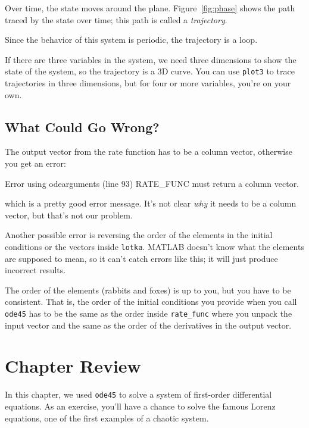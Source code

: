 
Over time, the state moves around the plane. Figure~\ref{fig:phase} shows
the path traced by the state over time; this path
is called a \emph{trajectory}.

Since the behavior of this system is periodic, the trajectory is a loop.

If there are three variables in the system, we need three dimensions to show
the state of the system, so the trajectory is a 3D curve.
You can use \lstinline{plot3} to trace trajectories in three dimensions,
but for four or more variables, you're on your own.



\subsection{What Could Go Wrong?}

The output vector from the rate function has to be a column vector, otherwise you get an error:

\begin{code}
Error using odearguments (line 93)
RATE_FUNC must return a column vector.
\end{code}
which is a pretty good error message.  It's not clear \emph{why}
it needs to be a column vector, but that's not our problem.


Another possible error is reversing the order of the elements in the
initial conditions or the vectors inside \lstinline{lotka}.  MATLAB
doesn't know what the elements are supposed to mean, so it can't catch
errors like this; it will just produce incorrect results.

The order of the elements (rabbits and foxes) is up to you, but
you have to be consistent.  That is, the order of the initial conditions you
provide when you call \lstinline{ode45} has to be the same as the order
inside \lstinline{rate_func} where you unpack the input vector and the
same as the order of the derivatives in the output vector.

\section{Chapter Review}

In this chapter, we used \lstinline{ode45} to solve a system of first-order differential equations.
As an exercise, you'll have a chance to solve the famous Lorenz equations, one of the first examples of a chaotic system.

